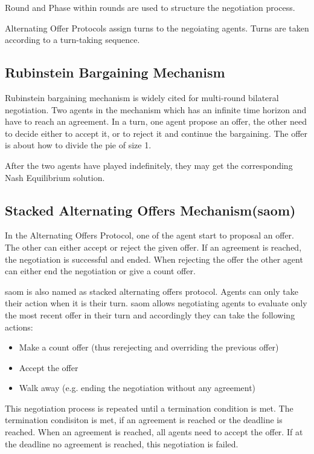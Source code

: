 \begin{definition}
Round and Phase within rounds are used to structure the negotiation process.
\end{definition}

\begin{definition}
Alternating Offer Protocols assign turns to the negoiating agents. Turns are taken according to a turn-taking sequence.
\end{definition}

\subsection{Rubinstein Bargaining Mechanism}
Rubinstein bargaining mechanism is widely cited for multi-round bilateral negotiation.
Two agents in the mechanism which has an infinite time horizon and have to reach an agreement. In a turn, one agent propose an offer, the other need to decide either to accept it, or to reject it and continue the bargaining\parencite{Rubinstein1982}. The offer is about how to divide the pie of size 1.

After the two agents have played indefinitely, they may get the corresponding Nash Equilibrium solution.

\subsection{Stacked Alternating Offers Mechanism(\gls{saom})} \label{background:saom}
In the Alternating Offers Protocol, one of the agent start to proposal an offer. The other can either accept or reject the given offer. If an agreement is reached, the negotiation is successful and ended. When rejecting the offer the other agent can either end the negotiation or give a count offer.

\gls{saom} is also named as stacked alternating offers protocol. Agents can only take their action when it is their turn. \gls{saom} allows negotiating agents to evaluate only the most recent offer in their turn and accordingly they can take the following actions:
\begin{itemize}
\item Make a count offer (thus rerejecting and overriding the previous offer)
\item Accept the offer
\item Walk away (e.g. ending the negotiation without any agreement)
\end{itemize}
This negotiation process is repeated until a termination condition is met. The termination condisiton is met, if an agreement is reached or the deadline is reached. When an agreement is reached, all agents need to accept the offer. If at the deadline no agreement is reached, this negotiation is failed. 

